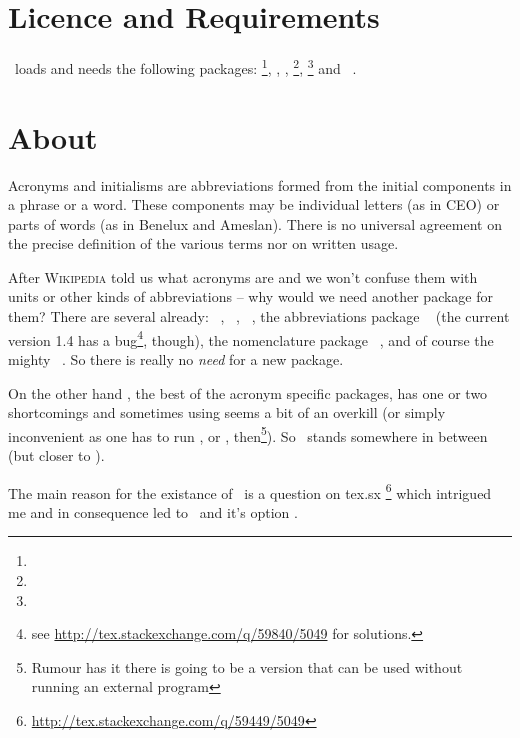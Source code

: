 \documentclass[load-preamble+,scrartcl={DIV10}]{cnltx-doc}
\newcommand*\wikipedia{%
\textsc{Wikipedia}}
\begin{document}
\section{Licence and Requirements}
\license

\acro\ loads and needs the following packages:
\footnote{}, , ,
\footnote{},
\footnote{} and
~\cite{pkg:translations}.

\section{About}
\begin{cnltxquote}
  Acronyms and initialisms are abbreviations formed from the initial
  components in a phrase or a word.  These components may be individual
  letters (as in CEO) or parts of words (as in Benelux and Ameslan).  There is
  no universal agreement on the precise definition of the various terms nor on
  written usage.
\end{cnltxquote}
After \wikipedia{} told us what acronyms are and we won't confuse them with
units or other kinds of abbreviations -- why would we need another package for
them?  There are several already: ~\cite{pkg:acronym},
~\cite{pkg:acromake}, ~\cite{pkg:acroterm}, the
abbreviations package ~\cite{pkg:abbrevs} (the current version
1.4 has a bug\footnote{see \url{http://tex.stackexchange.com/q/59840/5049} for
  solutions.}, though), the nomenclature package
~\cite{pkg:nomencl}, and of course the mighty
~\cite{pkg:glossaries}. So there is really no \emph{need} for
a new package.

On the other hand , the best of the acronym specific packages,
has one or two shortcomings and sometimes using  seems a bit
of an overkill (or simply inconvenient as one has to run
,  or , then\footnote{Rumour
  has it there is going to be a version that can be used without running an
  external program}). So \acro\ stands somewhere in between (but closer to
).

The main reason for the existance of \acro\ is a question on \acs{tex.sx}%
\footnote{\url{http://tex.stackexchange.com/q/59449/5049}} which intrigued me
and in consequence led to \acro\ and it's option .
\end{document}

